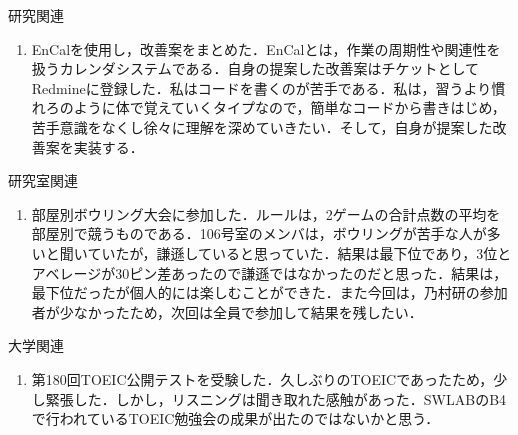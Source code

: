 \documentclass[fleqn, 14pt]{extarticlej}
\renewcommand\labelenumi{(\theenumi)}
\begin{document}
\begin{description}
  \itemsep -1mm

\item[　2.1] 研究関連
  \vspace{-0.8em}
  \begin{enumerate}
    \renewcommand{\labelenumi}{(1)}
  \item EnCalを使用し，改善案をまとめた．EnCalとは，作業の周期性や関連性を扱うカレンダシステムである．自身の提案した改善案はチケットとしてRedmineに登録した．私はコードを書くのが苦手である．私は，習うより慣れろのように体で覚えていくタイプなので，簡単なコードから書きはじめ，苦手意識をなくし徐々に理解を深めていきたい．そして，自身が提案した改善案を実装する．\\
    
  \end{enumerate}

  \vspace{-0.5em}
  \item[　2.2] 研究室関連
    \vspace{-1.0em}
    \begin{enumerate}
      \renewcommand{\labelenumi}{(2)}
    \item 部屋別ボウリング大会に参加した．ルールは，2ゲームの合計点数の平均を部屋別で競うものである．106号室のメンバは，ボウリングが苦手な人が多いと聞いていたが，謙遜していると思っていた．結果は最下位であり，3位とアベレージが30ピン差あったので謙遜ではなかったのだと思った．結果は，最下位だったが個人的には楽しむことができた．また今回は，乃村研の参加者が少なかったため，次回は全員で参加して結果を残したい．
    
    \end{enumerate}

\vspace{-0.5em}
\item[　2.3] 大学関連
\vspace{-0.8em}
\begin{enumerate}
\renewcommand{\labelenumi}{(2)}
\item 第180回TOEIC公開テストを受験した．久しぶりのTOEICであったため，少し緊張した．しかし，リスニングは聞き取れた感触があった．SWLABのB4で行われているTOEIC勉強会の成果が出たのではないかと思う．
\end{enumerate}

\end{description}

\vspace{-1.5em}
\end{document}
